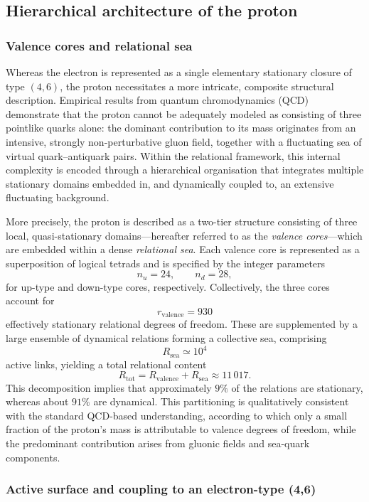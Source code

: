 \documentclass[11pt,a4paper]{article}
\begin{document}
\subsection{Hierarchical architecture of the proton}

\subsubsection{Valence cores and relational sea}

Whereas the electron is represented as a single elementary stationary closure of type \((4,6)\), the proton necessitates a more intricate, composite structural description. Empirical results from quantum chromodynamics (QCD) demonstrate that the proton cannot be adequately modeled as consisting of three pointlike quarks alone: the dominant contribution to its mass originates from an intensive, strongly non-perturbative gluon field, together with a fluctuating sea of virtual quark–antiquark pairs. Within the relational framework, this internal complexity is encoded through a hierarchical organisation that integrates multiple stationary domains embedded in, and dynamically coupled to, an extensive fluctuating background.

More precisely, the proton is described as a two-tier structure consisting of three local, quasi-stationary domains—hereafter referred to as the \emph{valence cores}—which are embedded within a dense \emph{relational sea}. Each valence core is represented as a superposition of logical tetrads and is specified by the integer parameters
\[
  n_u = 24, \qquad n_d = 28,
\]
for up-type and down-type cores, respectively. Collectively, the three cores account for
\[
  r_{\mathrm{valence}} = 930
\]
effectively stationary relational degrees of freedom. These are supplemented by a large ensemble of dynamical relations forming a collective sea, comprising
\[
  R_{\mathrm{sea}} \simeq 10^4
\]
active links, yielding a total relational content
\[
  R_{\mathrm{tot}} = R_{\mathrm{valence}} + R_{\mathrm{sea}} \approx 11\,017.
\]
This decomposition implies that approximately \(9\%\) of the relations are stationary, whereas about \(91\%\) are dynamical. This partitioning is qualitatively consistent with the standard QCD-based understanding, according to which only a small fraction of the proton’s mass is attributable to valence degrees of freedom, while the predominant contribution arises from gluonic fields and sea-quark components.

\subsubsection{Active surface and coupling to an electron-type (4,6)}
\end{document}

